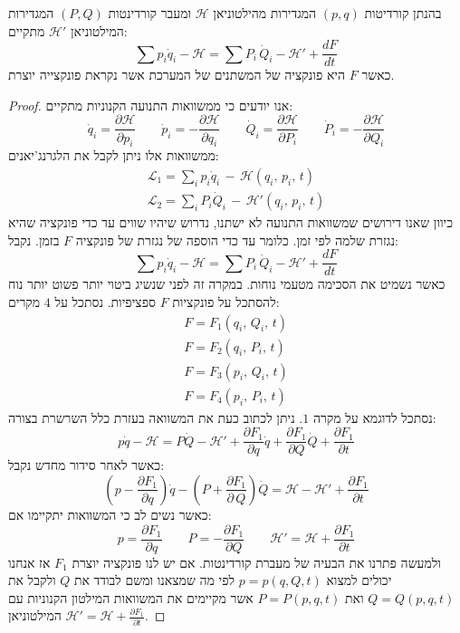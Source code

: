 \documentclass{tstextbook}
\begin{document}
\begin{theorem}
בהנתן קורדיטות \((p,q)\) המגדירות מהילטוניאן \(\mathcal{\mathcal{H}}\) ומעבר קורדינטות \((P,Q)\) המגדירות המילטוניאן \(\mathcal{H}'\) מתקיים:
$$\sum p_{i}\dot{q}_{i}-\mathcal{H}=\sum P_{i}\,\dot{Q}_{i}-\mathcal{H}'+{\frac{d F}{d t}}$$
כאשר \(F\) היא פונקציה של המשתנים של המערכת אשר נקראת פונקצייה יוצרת.

\end{theorem}
\begin{proof}
אנו יודעים כי ממשוואות התנועה הקנוניות מתקיים:
$$\dot{q}_{i}=\frac{\partial \mathcal{H}}{\partial p_{i}}\qquad \dot{p}_{i}=-\frac{\partial \mathcal{H}}{\partial q_{i}}\qquad \dot{Q}_{i}=\frac{\partial \mathcal{H}}{\partial P_{i}}\qquad \dot{P}_{i}=-\frac{\partial \mathcal{H}}{\partial Q_{i}}$$
ממשוואות אלו ניתן לקבל את הלגרנג'יאנים:
$$\begin{gather}\mathcal{L} _{1}= \sum_{i}p_{i}{\dot{q}}_{i}\,-\,\mathcal{H}\left( q_{i},\,p_{i},\,t \right)\\ \mathcal{L} _{2}= \sum_{i}P_{i}{\dot{Q}}_{i}\,-\,\mathcal{H}'\left( q_{i},\,p_{i},\,t \right) 
\end{gather}$$
כיוון שאנו דירושים שמשוואות התנועה לא ישתנו, נדרוש שיהיו שווים עד כדי פונקציה שהיא נגזרת שלמה לפי זמן. כלומר עד כדי הוספה של נגזרת של פונקציה \(F\) בזמן. נקבל:
$$\sum p_{i}\dot{q}_{i}-\mathcal{H}=\sum P_{i}\,\dot{Q}_{i}-\mathcal{H}'+{\frac{d F}{d t}}$$
כאשר נשמיט את הסכימה מטעמי נוחות.
במקרה זה לפני שנשיג ביטוי יותר פשוט יותר נוח להסתכל על פונקציות \(F\) ספציפיות. 
נסתכל על \(4\) מקרים:
$$\begin{array}{l}{{F=F_{1}(q_{i},\,Q_{i},\,t)}}\\ {{F=F_{2}(q_{i},\,P_{i},\,t)}}\\ {{F=F_{3}(p_{i},\,Q_{i},\,t)}}\\ {{F=F_{4}(p_{i},\,P_{i},\,t)}}\end{array}$$
נסתכל לדוגמא על מקרה \(1\). ניתן לכתוב כעת את המשוואה בעזרת כלל השרשרת בצורה:
$$p\dot{q}-\mathcal{H}=P\dot{Q}-\mathcal{H}'+{\frac{\partial F_{1}}{\partial q}}\dot{q}+{\frac{\partial F_{1}}{\partial Q}}\dot{Q}+{\frac{\partial F_{1}}{\partial t}}$$
כאשר לאחר סידור מחדש נקבל:
$$\left(p-\frac{\partial F_{1}}{\partial q}\right)\dot{q}-\left(P+\frac{\partial F_{1}}{\partial\,Q}\right)\dot{Q}=\mathcal{H}-\mathcal{H}'+\frac{\partial F_{1}}{\partial t}$$
כאשר נשים לב כי המשוואות יתקיימו אם:
$$p=\frac{\partial F_{1}}{\partial q}\qquad P=-\frac{\partial F_{1}}{\partial Q}\qquad \mathcal{H}'=\mathcal{H}+\frac{\partial F_{1}}{\partial t}$$
ולמעשה פתרנו את הבעיה של מעברת קורדינטות. אם יש לנו פונקציה יוצרת \(F_{1}\) אז אנחנו יכולים למצוא \(p=p(q,Q,t)\) לפי מה שמצאנו ומשם לבודד את \(Q\) ולקבל את \(Q=Q(p,q,t)\) ואת \(P=P(p,q,t)\) אשר מקיימים את המשוואות המילטון הקנוניות עם המילטוניאן \(\mathcal{H}'=\mathcal{H}+\frac{\partial F_{1}}{\partial t}\). 

\end{proof}
\end{document}
